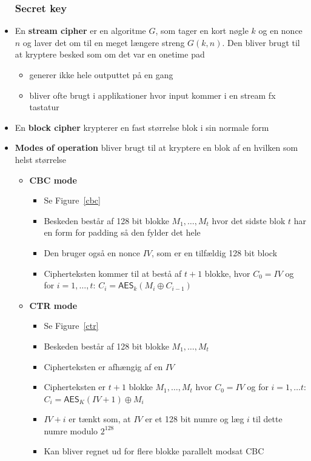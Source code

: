 \documentclass[a4, english]{article}
\begin{document}
\begin{itemize}
\subsubsection{Secret key}
  \item En \textbf{stream cipher} er en algoritme $G$, som tager en kort nøgle $k$ og en nonce $n$ og laver det om til en meget længere streng $G(k,n)$. Den bliver brugt til at kryptere besked som om det var en onetime pad 
  \begin{itemize}
  	\item generer ikke hele outputtet på en gang
    \item bliver ofte brugt i applikationer hvor input kommer i en stream fx tastatur
  \end{itemize}
  \item En \textbf{block cipher} krypterer en fast størrelse blok i sin normale form
 	\item \textbf{Modes of operation} bliver brugt til at kryptere en blok af en hvilken som helst størrelse
  \begin{itemize}
    \item \textbf{CBC mode} 
    \begin{itemize}
      \item Se Figure~\ref{cbc}
    	\item Beskeden består af 128 bit blokke $M_1, \dots, M_t$ hvor det sidste blok $t$ har en form for padding så den fylder det hele
      \item Den bruger også en nonce $IV$, som er en tilfældig 128 bit block 
      \item Cipherteksten kommer til at bestå af $t+1$ blokke, hvor $C_0=IV$ og for $i=1, \dots, t$: $C_i = \mathsf{AES}_k(M_i \oplus C_{i-1})$
    \end{itemize}
  	\item \textbf{CTR mode}
    \begin{itemize}
      \item Se Figure~\ref{ctr}
    	\item Beskeden består af 128 bit blokke $M_1, \dots, M_t$ 
      \item Cipherteksten er afhængig af en $IV$ 
      \item Cipherteksten er $t+1$ blokke $M_1, \dots, M_t$ hvor $C_0 = IV$ og for $i=1, \dots t$: $C_i = \mathsf{AES}_K(IV + 1) \oplus M_i$
      \item $IV + i$ er tænkt som, at $IV$ er et 128 bit numre og læg $i$ til dette numre modulo $2^{128}$ 
      \item Kan bliver regnet ud for flere blokke parallelt modsat CBC

\end{itemize}
\end{itemize}
\end{itemize}
\end{document}
